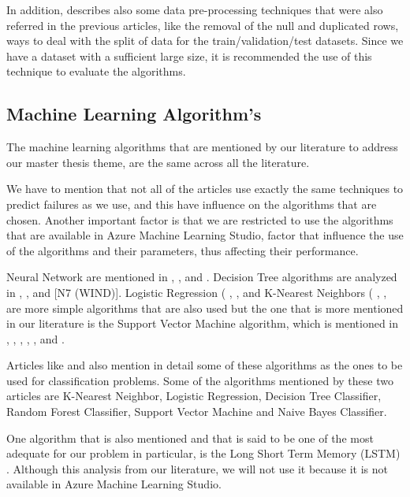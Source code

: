 In addition, \cite{MED_1} describes also some data pre-processing techniques that were also referred in the previous articles, like the removal of the null and duplicated rows, ways to deal with the split of data for the train/validation/test datasets.
Since we have a dataset with a sufficient large size, it is recommended the use of this technique to evaluate the algorithms.



\subsection{Machine Learning Algorithm's}

The machine learning algorithms that are mentioned by our literature to address our master thesis theme, are the same across all the literature.

We have to mention that not all of the articles use exactly the same techniques to predict failures as we use, and this have influence on the algorithms that are chosen. Another important factor is that we are restricted to use the algorithms that are available in Azure Machine Learning Studio, factor that influence the use of the algorithms and their parameters, thus affecting their performance.

Neural Network are mentioned in \cite{OLD_15_WIND}, \cite{OLD_20_WIND}, \cite{OLD_41_WIND} and \cite{N_8_WIND}. Decision Tree algorithms are analyzed in \cite{OLD_41_WIND}, \cite{39_WIND}, \cite{N_3_WIND} and [N7 (WIND)]. Logistic Regression ( \cite{N_5_WIND}, \cite{N_7_GENERAL}, \cite{N_8_WIND} and K-Nearest Neighbors ( \cite{39_WIND}, \cite{N_3_WIND}, \cite{N_4_WIND} are more simple algorithms that are also used but the one that is more mentioned in our literature is the Support Vector Machine algorithm, which is mentioned in \cite{OLD_41_WIND}, \cite{OLD_19_WIND}, \cite{39_WIND}, \cite{N_1_WIND}, \cite{N_2_WIND}, \cite{N_3_WIND} and \cite{N_8_WIND}.

Articles like \cite{ML_Alg_Analysis_2} and \cite{ML_Alg_Analysis} also mention in detail some of these algorithms as the ones to be used for classification problems. Some of the algorithms mentioned by these two articles are K-Nearest Neighbor, Logistic Regression, Decision Tree Classifier, Random Forest Classifier, Support Vector Machine and Naive Bayes Classifier.

One algorithm that is also mentioned and that is said to be one of the most adequate for our problem in particular, is the Long Short Term Memory (LSTM) \cite{TDC_1}. Although this analysis from our literature, we will not use it because it is not available in Azure Machine Learning Studio.


